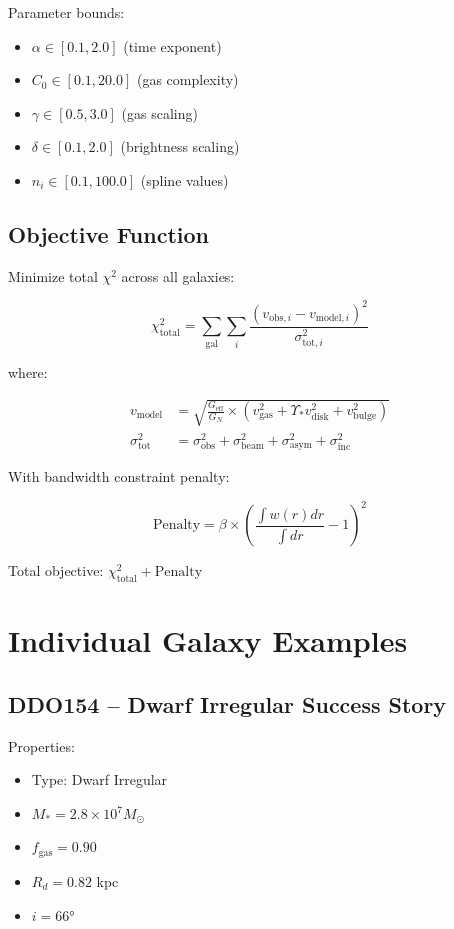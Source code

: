 \documentclass[12pt,letterpaper]{article}
\newcommand{\geff}{G_{\text{eff}}}
\newcommand{\gnewton}{G_N}
\newcommand{\chisq}{\chi^2}
\newcommand{\msun}{M_\odot}
\begin{document}
Parameter bounds:
\begin{itemize}
\item $\alpha \in [0.1, 2.0]$ (time exponent)
\item $C_0 \in [0.1, 20.0]$ (gas complexity)
\item $\gamma \in [0.5, 3.0]$ (gas scaling)
\item $\delta \in [0.1, 2.0]$ (brightness scaling)
\item $n_i \in [0.1, 100.0]$ (spline values)
\end{itemize}

\subsection{Objective Function}

Minimize total $\chisq$ across all galaxies:

\begin{equation}
\chisq_{\text{total}} = \sum_{\text{gal}} \sum_i \frac{(v_{\text{obs},i} - v_{\text{model},i})^2}{\sigma_{\text{tot},i}^2}
\end{equation}

where:

\begin{align}
v_{\text{model}} &= \sqrt{\frac{\geff}{\gnewton} \times (v_{\text{gas}}^2 + \Upsilon_* v_{\text{disk}}^2 + v_{\text{bulge}}^2)} \\
\sigma_{\text{tot}}^2 &= \sigma_{\text{obs}}^2 + \sigma_{\text{beam}}^2 + \sigma_{\text{asym}}^2 + \sigma_{\text{inc}}^2
\end{align}

With bandwidth constraint penalty:

\begin{equation}
\text{Penalty} = \beta \times \left(\frac{\int w(r)dr}{\int dr} - 1\right)^2
\end{equation}

Total objective: $\chisq_{\text{total}} + \text{Penalty}$

\section{Individual Galaxy Examples}

\subsection{DDO154 -- Dwarf Irregular Success Story}

Properties:
\begin{itemize}
\item Type: Dwarf Irregular
\item $M_* = 2.8 \times 10^7 \msun$
\item $f_{\text{gas}} = 0.90$
\item $R_d = 0.82$ kpc
\item $i = 66°$
\end{itemize}
\end{document}
